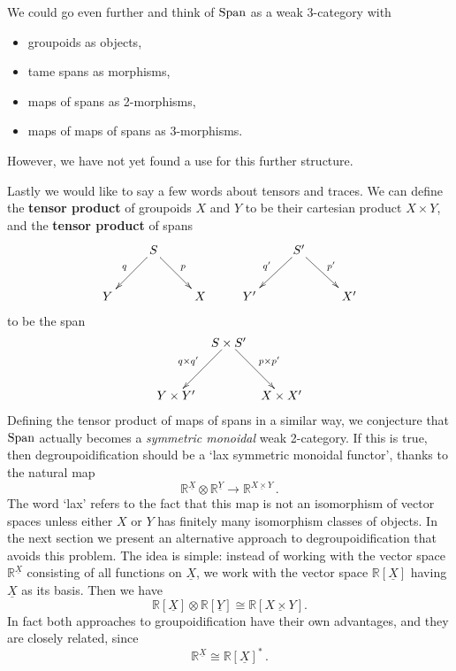 \documentclass{article}
\newcommand{\Span}{{\rm Span}}
\renewcommand{\to}{\rightarrow}
\newcommand{\tensor}{\otimes}
\newcommand{\iso}{\cong}
\newcommand{\R}{{\mathbb R}}
\renewcommand{\u}[1]{\underline{#1}}
\begin{document}
We could go even further and think of $\Span$ as a weak 3-category with 
\begin{itemize}
\item
groupoids as objects,
\item
tame spans as morphisms,
\item
maps of spans as 2-morphisms,
\item
maps of maps of spans as 3-morphisms.
\end{itemize}
However, we have not yet found a use for this further structure.

Lastly we would like to say a few words about tensors and traces. 
We can define the {\bf tensor product} of groupoids $X$ and $Y$ 
to be their cartesian product $X \times Y$, and the {\bf tensor 
product} of spans
\[
\xymatrix{
& S \ar[dl]_{q} \ar[dr]^{p} & & & S' \ar[dl]_{q'} \ar[dr]^{p'} & \\
Y & & X & Y' & & X'
}
\]
to be the span
\[
\xy
(0,15)*{S\times S'}="B";(-15,0)*{Y\times Y'}="A";(15,0)*{X\times X'}="C";
{\ar_{q \times q'} (-2,13);(-13,2)};
{\ar^{p \times p'} (2,13);(13,2)};
\endxy
\]
Defining the tensor product of maps of spans in a similar way, we
conjecture that $\Span$ actually becomes a \textit{symmetric monoidal}
weak 2-category\cite{McCrudden}.  If this is true, then
degroupoidification should be a `lax symmetric monoidal functor',
thanks to the natural map
\[       \R^{\u{X}} \tensor \R^{\u{Y}} \to \R^{\u{X \times Y}} \, .\]
The word `lax' refers to the fact that this map is not an isomorphism
of vector spaces unless either $X$ or $Y$ has finitely many isomorphism
classes of objects.  In the next section we present an alternative
approach to degroupoidification that avoids this problem.  The idea
is simple: instead of working with the vector space $\R^{\u{X}}$ consisting
of all functions on $\u{X}$, we work with the vector space $\R[\u{X}]$
having $\u{X}$ as its basis.  Then we have
\[       \R[\u{X}] \tensor \R[\u{Y}] \iso \R[\u{X \times Y}]  .\]
In fact both approaches to groupoidification have their own advantages,
and they are closely related, since
\[       \R^{\u{X}} \iso \R[\u{X}]^*  \, .\]
\end{document}
